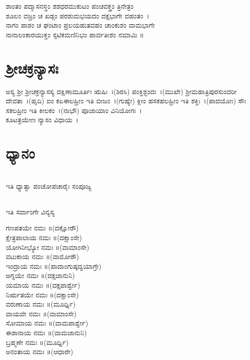 ಶಾಂತಂ ಪದ್ಮಾಸನಸ್ಥಂ ಶಶಧರಮುಕುಟಂ ಪಂಚವಕ್ತ್ರಂ ತ್ರಿನೇತ್ರಂ\\
ಶೂಲಂ ವಜ್ರಂ ಚ ಖಡ್ಗಂ ಪರಶುಮಭಯದಂ ದಕ್ಷಭಾಗೇ ವಹಂತಂ~।\\
ನಾಗಂ ಪಾಶಂ ಚ ಘಂಟಾಂ ಪ್ರಲಯಹುತವಹಂ ಚಾಂಕುಶಂ ವಾಮಭಾಗೇ\\
ನಾನಾಲಂಕಾರಯುಕ್ತಂ ಸ್ಫಟಿಕಮಣಿನಿಭಂ ಪಾರ್ವತೀಶಂ ನಮಾಮಿ ॥

\section{ಶ್ರೀಚಕ್ರನ್ಯಾಸಃ}
ಅಸ್ಯ ಶ್ರೀ ಶ್ರೀಚಕ್ರನ್ಯಾಸಸ್ಯ ದಕ್ಷಿಣಾಮೂರ್ತಿಃ ಋಷಿಃ~।(ಶಿರಸಿ) ಪಂಕ್ತಿಶ್ಛಂದಃ~।(ಮುಖೇ) ಶ್ರೀಮಹಾತ್ರಿಪುರಸುಂದರೀ ದೇವತಾ~।(ಹೃದಿ) ಐಂ ಕಏಈಲಹ್ರೀಂ ಇತಿ ಬೀಜಂ~।(ಗುಹ್ಯೇ) ಕ್ಲೀಂ ಹಸಕಹಲಹ್ರೀಂ ಇತಿ ಶಕ್ತಿಃ~।(ಪಾದಯೋಃ) ಸೌಃ ಸಕಲಹ್ರೀಂ ಇತಿ ಕೀಲಕಂ~।(ನಾಭೌ) ಪೂಜಾಯಾಂ ವಿನಿಯೋಗಃ~।\\
ಕೂಟತ್ರಯೇಣ ನ್ಯಾಸಂ ವಿಧಾಯ~।
\section{ಧ್ಯಾನಂ}
\\
 ಇತಿ ಧ್ಯಾತ್ವಾ ಪಂಚೋಪಚಾರೈಃ ಸಂಪೂಜ್ಯ

\\ ಇತಿ ಸರ್ವಾಂಗೇ ವಿನ್ಯಸ್ಯ

 ಗಣಪತಯೇ ನಮಃ ॥(ದಕ್ಷೋರೌ)\\
 ಕ್ಷೇತ್ರಪಾಲಾಯ ನಮಃ ॥(ದಕ್ಷಾಂಸೇ)\\
 ಯೋಗಿನೀಭ್ಯೋ ನಮಃ ॥(ವಾಮಾಂಸೇ)\\
 ವಟುಕಾಯ ನಮಃ ॥(ವಾಮೋರೌ)\\
 ಇಂದ್ರಾಯ ನಮಃ ॥(ಪಾದಾಂಗುಷ್ಠದ್ವಯಾಗ್ರೇ)\\
 ಅಗ್ನಯೇ ನಮಃ ॥(ದಕ್ಷಜಾನುನಿ)\\
 ಯಮಾಯ ನಮಃ ॥(ದಕ್ಷಪಾರ್ಶ್ವೇ)\\
 ನಿರ್ಋತಯೇ ನಮಃ ॥(ದಕ್ಷಾಂಸೇ)\\
 ವರುಣಾಯ ನಮಃ ॥(ಮೂರ್ಧ್ನಿ)\\
 ವಾಯವೇ ನಮಃ ॥(ವಾಮಾಂಸೇ)\\
 ಸೋಮಾಯ ನಮಃ ॥(ವಾಮಪಾರ್ಶ್ವೇ)\\
 ಈಶಾನಾಯ ನಮಃ ॥(ವಾಮಜಾನುನಿ)\\
 ಬ್ರಹ್ಮಣೇ ನಮಃ ॥(ಮೂರ್ಧ್ನಿ)\\
 ಅನಂತಾಯ ನಮಃ ॥(ಆಧಾರೇ)
